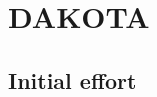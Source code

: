 \documentclass[12pt]{article}
\begin{document}


\begin{comment}


  delta_G_i_sol:

  ||delta_u_bar_i_sol||inf = 2.6204314565506897e+00

Checking that delta_G_i_sol == b_i ...

Checking that ||delta_G_u_i_sol - b_u_i|| is sufficiently small:

  rel_err( delta_G_u_i_sol, b_u_i )
    = 2.3347050750503837e-04 <= lin_grad_sol_tol = 1.0000000000000000e-02

  where:
    ||delta_G_u_i_sol||inf = 1.4745558103005999e+02
    ||b_u_i||inf = 1.4738826906856852e+02


  delta_G_i_sol:

  ||delta_u_bar_i_sol||inf = 2.6304146674189037e+00

Checking that delta_G_i_sol == b_i ...

Checking that ||delta_G_u_i_sol - b_u_i|| is sufficiently small:

  rel_err( delta_G_u_i_sol, b_u_i )
    = 1.9108525710481345e-04 <= lin_grad_sol_tol = 1.0000000000000000e-02

  where:
    ||delta_G_u_i_sol||inf = 1.4744788899717511e+02
    ||b_u_i||inf = 1.4738826906856852e+02

\end{comment}


\section{DAKOTA}

\subsection{Initial effort}
\end{document}
